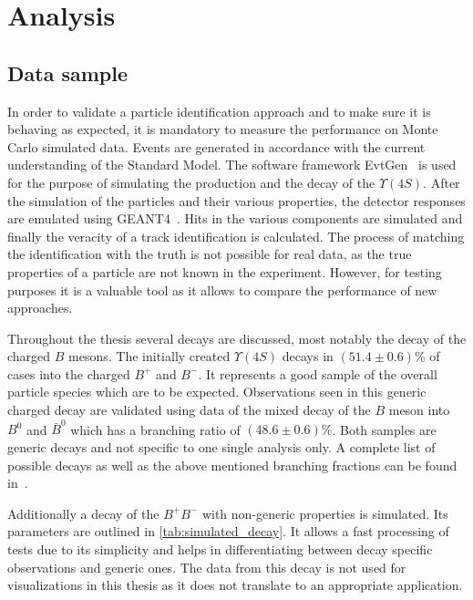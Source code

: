 \chapter{Analysis}
\label{chap:analysis}

\section{Data sample}
\label{sec:data_sample}

In order to validate a particle identification approach and to make sure it is behaving as expected, it is mandatory to measure the performance on Monte Carlo simulated data. Events are generated in accordance with the current understanding of the Standard Model. The software framework EvtGen~\cite{LANGE2001152} is used for the purpose of simulating the production and the decay of the $\Upsilon(4S)$. After the simulation of the particles and their various properties, the detector responses are emulated using GEANT4~\cite{AGOSTINELLI2003250}. Hits in the various components are simulated and finally the veracity of a track identification is calculated. The process of matching the identification with the truth is not possible for real data, as the true properties of a particle are not known in the experiment. However, for testing purposes it is a valuable tool as it allows to compare the performance of new approaches.

Throughout the thesis several decays are discussed, most notably the decay of the charged $B$ mesons. The initially created $\Upsilon(4S)$ decays in $(51.4 \pm 0.6) \%$ of cases into the charged $B^+$ and $B^-$. It represents a good sample of the overall particle species which are to be expected. Observations seen in this generic charged decay are validated using data of the mixed decay of the $B$ meson into $B^0$ and $\bar{B}^0$ which has a branching ratio of $(48.6 \pm 0.6) \%$. Both samples are generic decays and not specific to one single analysis only. A complete list of possible decays as well as the above mentioned branching fractions can be found in~\cite{Patrignani:2016xqp}.

Additionally a decay of the $B^+ B^-$ with non-generic properties is simulated. Its parameters are outlined in \autoref{tab:simulated_decay}. It allows a fast processing of tests due to its simplicity and helps in differentiating between decay specific observations and generic ones. The data from this decay is not used for visualizations in this thesis as it does not translate to an appropriate application.

